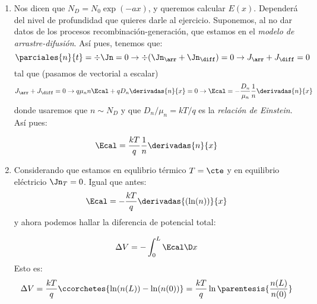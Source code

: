 	\begin{enumerate}[label=\alph*)]
		\item Nos dicen que $N_D=N_0 \exp(-ax)$, y queremos calcular $E(x)$. Dependerá del nivel de profundidad que quieres darle al ejercicio. Suponemos, al no dar datos de los procesos recombinación-generación, que estamos en el \textit{modelo de arrastre-difusión}. Así pues, tenemos que:
		\begin{equation}
			\parciales{n}{t} = \div \Jn = 0 \rightarrow \div (\Jn_{\arr}+\Jn_{\diff}) = 0 \rightarrow J_{\arr}+J_{\diff} = 0
		\end{equation}
		tal que (pasamos de vectorial a escalar)
		\begin{equation}
			J_{\arr}+J_{\diff} = 0 \rightarrow q \mu_n n \Ecal + q D_n \derivadas{n}{x} = 0 \rightarrow \Ecal = - \frac{D_n}{\mu_n} \frac{1}{n} \derivadas{n}{x}
		\end{equation}
		donde usaremos que $n\sim N_D$ y que $D_n / \mu_n = kT/q$ es la \textit{relación de Einstein}. Así pues:

		\begin{equation}
			\Ecal = \frac{kT}{q} \frac{1}{n} \derivadas{n}{x}
		\end{equation}
		\item Considerando que estamos en equlibrio térmico $T=\cte$ y en equilibrio eléctricio $\Jn_T=0$. Igual que antes:
		\begin{equation}
			\Ecal = - \frac{kT}{q} \derivadas{(\ln(n))}{x}
		\end{equation}
		y ahora podemos hallar la diferencia de potencial total:

		\begin{equation}
			\Delta V = - \int_{0}^L \Ecal \D x
		\end{equation}
		Esto es:
		\begin{equation}
			\Delta V = \frac{kT}{q} \ccorchetes{\ln(n(L))-\ln(n(0))} = \frac{kT}{q} \ln\parentesis{\frac{n(L)}{n(0)}}
		\end{equation}
	\end{enumerate}
